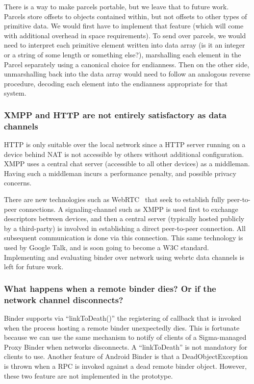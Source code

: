 \documentclass[prodmode]{acmlarge}
\begin{document}
There is a way to make parcels portable, but we leave that to future work. Parcels store offsets to objects contained within, but not offsets to other types of primitive data. We would first have to implement that feature (which will come with additional overhead in space requirements). To send over parcels, we would need to interpret each primitive element written into data array (is it an integer or a string of some length or something else?), marshalling each element in the Parcel separately using a canonical choice for endianness. Then on the other side, unmarshalling back into the data array would need to follow an analogous reverse procedure, decoding each element into the endianness appropriate for that system.

\subsubsection{XMPP and HTTP are not entirely satisfactory as data channels}
HTTP is only suitable over the local network since a HTTP server running on a device behind NAT is not accessible by others without additional configuration. XMPP uses a central chat server (accessible to all other devices) as a middleman. Having such a middleman incurs a performance penalty, and possible privacy concerns.

There are new technologies such as WebRTC~\cite{GoogleTalkLibrary} that seek to establish fully peer-to-peer connections. A signaling-channel such as XMPP is used first to exchange descriptors between devices, and then a central server (typically hosted publicly by a third-party) is involved in establishing a direct peer-to-peer connection. All subsequent communication is done via this connection. This same technology is used by Google Talk, and is soon going to become a W3C standard. Implementing and evaluating binder over network using webrtc data channels is left for future work.

\subsubsection{What happens when a remote binder dies? Or if the network channel disconnects?}
Binder supports via ``linkToDeath()'' the registering of callback that is invoked when the process hosting a remote binder unexpectedly dies. This is fortunate because we can use the same mechanism to notify of clients of a Sigma-managed Proxy Binder when networks disconnects. A ``linkToDeath'' is not mandatory for clients to use. Another feature of Android Binder is that a DeadObjectException is thrown when a RPC is invoked against a dead remote binder object. However, these two feature are not implemented in the prototype.
\end{document}
